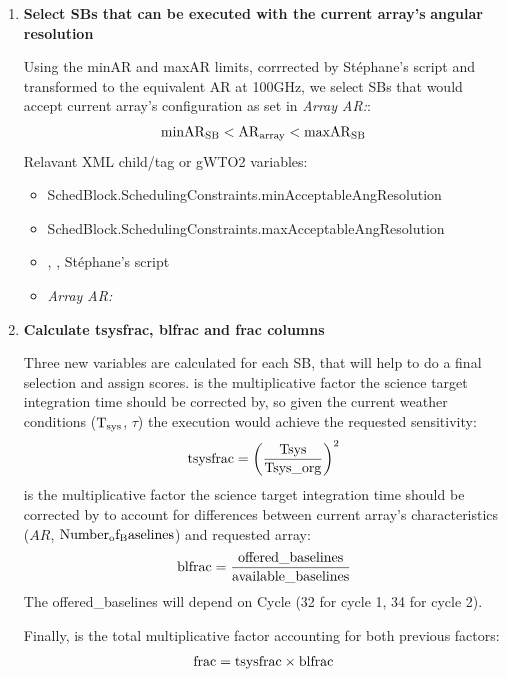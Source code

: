\documentclass[a4paper,10pt,english]{sphinxmanual}
\begin{document}
\begin{enumerate}
\item {} 
\textbf{Select SBs that can be executed with the current array's}
\textbf{angular resolution}

Using the minAR and maxAR limits, corrrected by Stéphane's script and transformed
to the equivalent AR at 100GHz, we select SBs that would accept current array's
configuration as set in \emph{Array AR:}:
\begin{gather}
\begin{split}\rm{minAR}_{\rm{SB}} < \rm{AR}_{\rm{array}} < \rm{maxAR}_{\rm{SB}}\end{split}\notag
\end{gather}
Relavant XML child/tag or gWTO2 variables:
\begin{itemize}
\item {} 
SchedBlock.SchedulingConstraints.minAcceptableAngResolution

\item {} 
SchedBlock.SchedulingConstraints.maxAcceptableAngResolution

\item {} 
, , Stéphane's script

\item {} 
\emph{Array AR:}

\end{itemize}

\item {} 
\textbf{Calculate tsysfrac, blfrac and frac columns}

Three new variables are calculated for each SB, that will help to do a final
selection and assign scores.  is the multiplicative factor
the science target integration time should be corrected by, so given the
current weather conditions (\(\rm{T}_{\rm{sys}}\), \(\tau\))
the execution would achieve the requested sensitivity:
\begin{gather}
\begin{split}\rm{tsysfrac} = \left(\frac{\rm{Tsys}}{\rm{Tsys\_org}}\right)^{2}\end{split}\notag
\end{gather}
 is the multiplicative factor the science target integration
time should be corrected by to account for differences between current array's
characteristics (\(AR\), \(\rm{Number_of_Baselines}\)) and requested
array:
\begin{gather}
\begin{split}\rm{blfrac} = \frac{offered\_baselines}{\rm{available\_baselines}}\end{split}\notag
\end{gather}
The offered\_baselines will depend on Cycle (32 for cycle 1, 34 for cycle 2).

Finally,  is the total multiplicative factor accounting for
both previous factors:
\begin{gather}
\begin{split}\rm{frac} = \rm{tsysfrac} \times\rm{blfrac}\end{split}\notag
\end{gather}
\end{enumerate}
\end{document}
